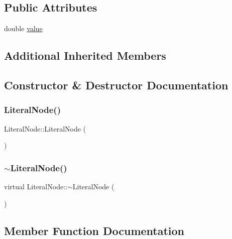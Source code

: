\subsection*{Public Attributes}
\begin{DoxyCompactItemize}
\item 
double \hyperlink{classLiteralNode_aaead85ec08c6a4ec23534a547176a450}{value}
\end{DoxyCompactItemize}
\subsection*{Additional Inherited Members}


\subsection{Constructor \& Destructor Documentation}
\mbox{\label{classLiteralNode_ae50674f947b26ee018592984c6c6117b}} 
\subsubsection{\texorpdfstring{Literal\+Node()}{LiteralNode()}}
{\footnotesize\ttfamily Literal\+Node\+::\+Literal\+Node (\begin{DoxyParamCaption}{ }\end{DoxyParamCaption})}

\mbox{\label{classLiteralNode_a09793ae51506882eaa8d345eeef90d16}} 
\subsubsection{\texorpdfstring{$\sim$\+Literal\+Node()}{~LiteralNode()}}
{\footnotesize\ttfamily virtual Literal\+Node\+::$\sim$\+Literal\+Node (\begin{DoxyParamCaption}{ }\end{DoxyParamCaption})\hspace{0.3cm}{\ttfamily [virtual]}}



\subsection{Member Function Documentation}
\mbox{\label{classLiteralNode_ac468128f093b3955ddd7c85eaa959ec2}} 
